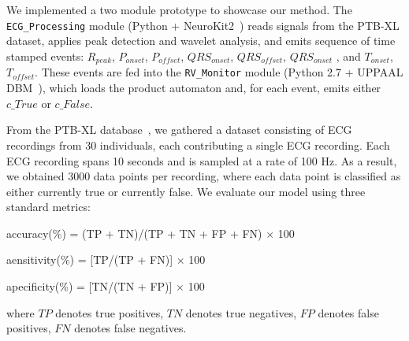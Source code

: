 \section{}


We implemented a two module prototype to showcase our method. The \texttt{ECG\_Processing} module (Python + NeuroKit2~\cite{makowski2021neurokit2}) reads signals from the PTB-XL dataset, applies peak detection and wavelet analysis, and emits sequence of time stamped events: $R_{peak}$, $P_{onset}$, $P_{offset}$, $QRS_{onset}$, $QRS_{offset}$, $QRS_{onset}$ , and $T_{onset}$, $T_{offset}$. These events are fed into the \texttt{RV\_Monitor} module (Python 2.7 + UPPAAL DBM~\cite{UPPAAL}), which loads the product automaton and, for each event, emits either $c\_True$ or $c\_False$.



From the PTB-XL database~\cite{wagner2020ptb}, we gathered a dataset consisting of ECG recordings from 30 individuals, each contributing a single ECG recording. Each ECG recording spans 10 seconds and is sampled at a rate of 100 Hz. As a result, we obtained 3000 data points per recording, where each data point is classified as either currently true or currently false. We evaluate our model using three standard metrics:


accuracy(\%) = (TP + TN)/(TP + TN + FP + FN) $\times$ 100

aensitivity(\%) = [TP/(TP + FN)] $\times$ 100

apecificity(\%) = [TN/(TN + FP)] $\times$ 100


where
	$TP$ denotes true positives,
	$TN$ denotes true negatives,
	$FP$ denotes false positives,
	$FN$ denotes false negatives.


